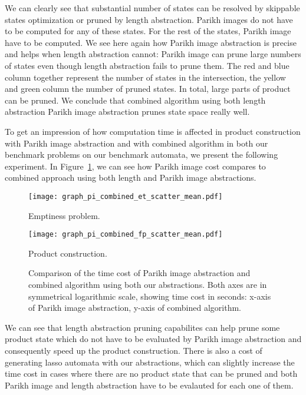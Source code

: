We can clearly see that substantial number of states can be resolved by skippable states optimization or pruned by length abstraction. Parikh images do not have to be computed for any of these states. For the rest of the states, Parikh image have to be computed. We see here again how Parikh image abstraction is precise and helps when length abstraction cannot: Parikh image can prune large numbers of states even though length abstraction fails to prune them. The red and blue column together represent the number of states in the intersection, the yellow and green column the number of pruned states. In total, large parts of product can be pruned. We conclude that combined algorithm using both length abstraction Parikh image abstraction prunes state space really well.

To get an impression of how computation time is affected in product construction with Parikh image abstraction and with combined algorithm in both our benchmark problems on our benchmark automata, we present the following experiment. In Figure~\ref{fig:graph:pi_comb_time_cost_comp}, we can see how Parikh image cost compares to combined approach using both length and Parikh image abstractions.
\begin{figure}[ht]
    \centering
    \begin{minipage}{0.49\linewidth}
        \centering
        \texttt{[image: graph\_pi\_combined\_et\_scatter\_mean.pdf]}
        \caption{Emptiness problem.}
        \label{fig:graph:et_pi_comb_time_difference}
    \end{minipage}
    \hfill
    \begin{minipage}{0.49\linewidth}
        \centering
        \texttt{[image: graph\_pi\_combined\_fp\_scatter\_mean.pdf]}
        \caption{Product construction.}
        \label{fig:graph:fp_pi_comb_time_difference}
    \end{minipage}
    \vspace{0.5cm}
    \caption{Comparison of the time cost of Parikh image abstraction and combined algorithm using both our abstractions. Both axes are in symmetrical logarithmic scale, showing time cost in seconds: x-axis of Parikh image abstraction, y-axis of combined algorithm.}
    \label{fig:graph:pi_comb_time_cost_comp}
\end{figure}

We can see that length abstraction pruning capabilites can help prune some product state which do not have to be evaluated by Parikh image abstraction and consequently speed up the product construction. There is also a cost of generating lasso automata with our abstractions, which can slightly increase the time cost in cases where there are no product state that can be pruned and both Parikh image and length abstraction have to be evalauted for each one of them.

